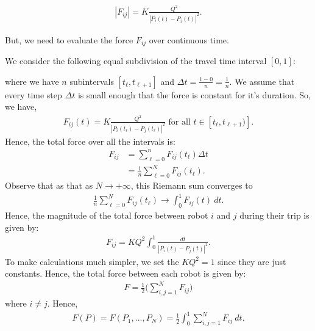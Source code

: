 \begin{align*}
    |F_{ij}| = K\frac{Q^2}{|P_i(t) - P_j(t)|^2}.
\end{align*}

But, we need to evaluate the force \( F_{ij} \) over continuous time. 

We consider the following equal subdivision of the travel time interval \( [0,1] \):

\begin{center}
\end{center}


where we have \( n \) subintervals \( [t_{\ell}, t_{\ell + 1}] \) and \( \Delta t = \frac{1-0}{n} = \frac{1}{n} \). We assume that every time step \( \Delta t \) is small enough that the force is constant for it's duration.
So, we have,
\begin{align*}
    F_{ij}(t) = K \frac{Q^2}{|P_i(t_{\ell}) - P_j(t_{\ell})|^2} \text{ for all } t \in [t_{\ell},t_{\ell+1} )].
\end{align*} 
Hence, the total force over all the intervals is:
\begin{align*}
    F_{ij} &= \sum_{\ell=0}^{n} F_{ij}(t_{\ell}) \Delta t \\
           &= \frac{1}{n} \sum_{\ell=0}^{N} F_{ij}(t_{\ell}).
\end{align*}
Observe that as that as \( N \to +\infty \), this Riemann sum converges to 
\begin{align*}
    \frac{1}{n} \sum_{\ell=0}^{N} F_{ij}(t_{\ell}) \to \int_{0}^{1}F_{ij}(t) \ dt.
\end{align*} 
Hence, the magnitude of the total force between robot \( i \) and \( j \) during their trip is given by:
\begin{align*}
    F_{ij} = KQ^2 \int_{0}^{1} \frac{dt}{|P_i(t) - P_j(t)|^2}.
\end{align*}
To make calculations much simpler, we set the \( KQ^2 = 1 \) since they are just constants. Hence, the total force between each robot is given by:
\begin{align*}
    F = \frac{1}{2}\bigg( \sum_{i,j = 1}^{N} F_{ij}    \bigg)
\end{align*}
where \( i \neq j \). Hence, 
\begin{align*}
    F(P) = F(P_1,...,P_N) = \frac{1}{2} \int_{0}^{1} \sum_{i,j = 1}^{N} F_{ij}  \ dt.
\end{align*}

